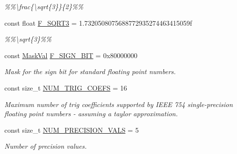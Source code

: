 \begin{DoxyCompactItemize}
\begin{DoxyCompactList}\small\item\em \%\%\textbackslash{}frac\{\textbackslash{}sqrt\{3\}\}\{2\}\%\% \end{DoxyCompactList}\item 
\hypertarget{group___scalar_math_consts_ga1a5c35ecfaa4a8bbb408287ab3d38248}{}const float \hyperlink{group___scalar_math_consts_ga1a5c35ecfaa4a8bbb408287ab3d38248}{F\+\_\+\+S\+Q\+R\+T3} = 1.\+7320508075688772935274463415059f\label{group___scalar_math_consts_ga1a5c35ecfaa4a8bbb408287ab3d38248}

\begin{DoxyCompactList}\small\item\em \%\%\textbackslash{}sqrt\{3\}\%\% \end{DoxyCompactList}\item 
const \hyperlink{group___scalar_math_consts_gab1b391d7995f105a3340b15c6c9d0763}{Mask\+Val} \hyperlink{group___scalar_math_consts_gae9346089acea1670286e7cbe27bdbbbb}{F\+\_\+\+S\+I\+G\+N\+\_\+\+B\+I\+T} = 0x80000000
\begin{DoxyCompactList}\small\item\em Mask for the sign bit for standard floating point numbers. \end{DoxyCompactList}\item 
const size\+\_\+t \hyperlink{group___scalar_math_consts_gab7b8a16b47f0cca40952e44fdd24f87d}{N\+U\+M\+\_\+\+T\+R\+I\+G\+\_\+\+C\+O\+E\+F\+S} = 16
\begin{DoxyCompactList}\small\item\em Maximum number of trig coefficients supported by I\+E\+E\+E 754 single-\/precision floating point numbers -\/ assuming a taylor approximation. \end{DoxyCompactList}\item 
\hypertarget{group___scalar_math_consts_ga5c411f18f77bce82247b32ea257204fb}{}const size\+\_\+t \hyperlink{group___scalar_math_consts_ga5c411f18f77bce82247b32ea257204fb}{N\+U\+M\+\_\+\+P\+R\+E\+C\+I\+S\+I\+O\+N\+\_\+\+V\+A\+L\+S} = 5\label{group___scalar_math_consts_ga5c411f18f77bce82247b32ea257204fb}

\begin{DoxyCompactList}\small\item\em Number of precision values. \end{DoxyCompactList}\end{DoxyCompactItemize}
